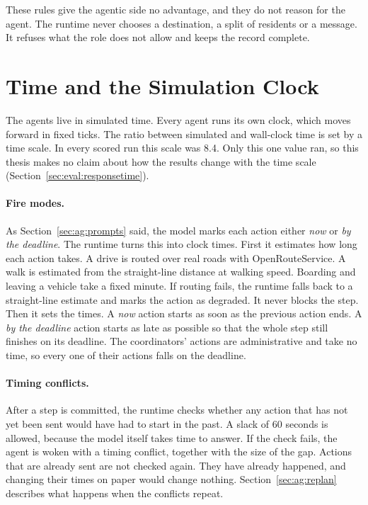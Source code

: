 These rules give the agentic side no advantage, and they do not reason for the
agent. The runtime never chooses a destination, a split of residents or a
message. It refuses what the role does not allow and keeps the record
complete.

\section{Time and the Simulation Clock}
\label{sec:ag:crons}

The agents live in simulated time. Every agent runs its own clock, which moves
forward in fixed ticks. The ratio between simulated and wall-clock time is set
by a time scale. In every scored run this scale was 8.4. Only this
one value ran, so this thesis makes no claim about how the results change with
the time scale (Section~\ref{sec:eval:responsetime}).

\paragraph{Fire modes.} As Section~\ref{sec:ag:prompts} said, the model marks
each action either \emph{now} or \emph{by the deadline}. The runtime turns this
into clock times. First it estimates how long each action takes. A drive is
routed over real roads with OpenRouteService. A walk is estimated from the
straight-line distance at walking speed. Boarding and leaving a vehicle take a
fixed minute. If routing fails, the runtime falls back to a straight-line
estimate and marks the action as degraded. It never blocks the step. Then it
sets the times. A \emph{now} action starts as soon as the previous action ends.
A \emph{by the deadline} action starts as late as possible so that the whole
step still finishes on its deadline. The coordinators' actions are
administrative and take no time, so every one of their actions falls on the
deadline.

\paragraph{Timing conflicts.} After a step is committed, the runtime checks
whether any action that has not yet been sent would have had to start in the
past. A slack of 60 seconds is allowed, because the model itself takes time to
answer. If the check fails, the agent is woken with a timing conflict, together
with the size of the gap. Actions that are already sent are not checked again.
They have already happened, and changing their times on paper would change
nothing. Section~\ref{sec:ag:replan} describes what happens
when the conflicts repeat.


